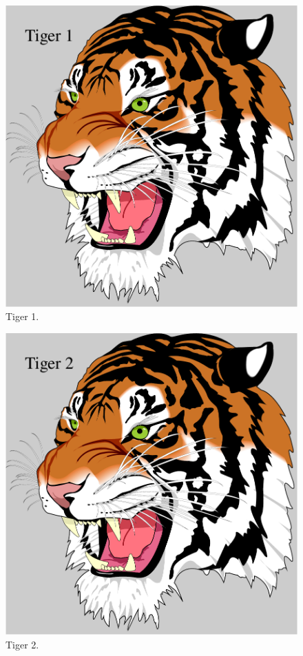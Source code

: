 \documentclass[a4paper,fleqn,dvipdfmx,11pt]{jreport}
\begin{document}
\begin{multicols}{2}
   	\begin{figure}[H]
        \centering
   		\includegraphics[width=0.6\columnwidth]{tiger_1.pdf}
   		\caption{Tiger 1.}
   		\label{fig:abst1}
   	\end{figure}

   	\begin{figure}[H]
        \centering
   		\includegraphics[width=0.6\columnwidth]{tiger_2.pdf}
   		\caption{Tiger 2.}
   		\label{fig:abst2}
   	\end{figure}
\end{multicols}

\end{document}
